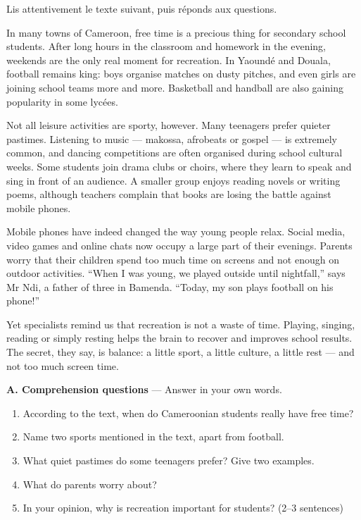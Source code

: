 \documentclass[11pt]{article}
\newcounter{popsec}
\newcounter{popsub}
\newcommand{\courssub}[1]{%
  \stepcounter{popsub}%
  \par\vspace{9pt}\noindent{\popxbold\fontsize{11.5}{13}\selectfont\color{popink}{\color{poporange}\thepopsec.\thepopsub}\hspace{6pt}#1}\par\nopagebreak\vspace{4pt}
}
\begin{document}
\courssub{Je me prépare au Bac}

\begin{exercice}
Lis attentivement le texte suivant, puis réponds aux questions.

\begin{textebox}
In many towns of Cameroon, free time is a precious thing for secondary school students. After long hours in the classroom and homework in the evening, weekends are the only real moment for recreation. In Yaoundé and Douala, football remains king: boys organise matches on dusty pitches, and even girls are joining school teams more and more. Basketball and handball are also gaining popularity in some lycées.

Not all leisure activities are sporty, however. Many teenagers prefer quieter pastimes. Listening to music — makossa, afrobeats or gospel — is extremely common, and dancing competitions are often organised during school cultural weeks. Some students join drama clubs or choirs, where they learn to speak and sing in front of an audience. A smaller group enjoys reading novels or writing poems, although teachers complain that books are losing the battle against mobile phones.

Mobile phones have indeed changed the way young people relax. Social media, video games and online chats now occupy a large part of their evenings. Parents worry that their children spend too much time on screens and not enough on outdoor activities. “When I was young, we played outside until nightfall,” says Mr Ndi, a father of three in Bamenda. “Today, my son plays football on his phone!”

Yet specialists remind us that recreation is not a waste of time. Playing, singing, reading or simply resting helps the brain to recover and improves school results. The secret, they say, is balance: a little sport, a little culture, a little rest — and not too much screen time.
\end{textebox}

\textbf{A. Comprehension questions} — Answer in your own words.

\begin{enumerate}
\item According to the text, when do Cameroonian students really have free time?
\item Name two sports mentioned in the text, apart from football.
\item What quiet pastimes do some teenagers prefer? Give two examples.
\item What do parents worry about?
\item In your opinion, why is recreation important for students? (2--3 sentences)
\end{enumerate}


\end{exercice}
\end{document}
